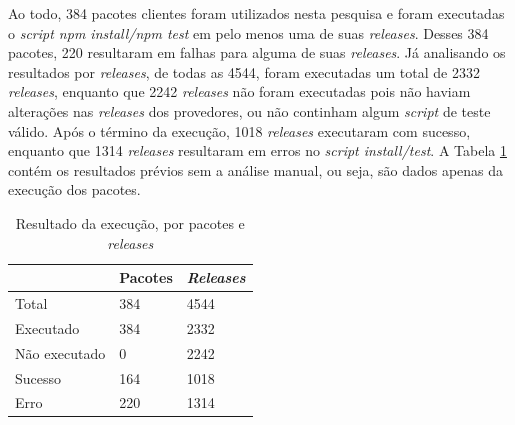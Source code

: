 

Ao todo, 384 pacotes clientes foram utilizados nesta pesquisa e foram executadas o \textit{script npm install/npm test} em pelo menos uma de suas \textit{releases}. Desses 384 pacotes, 220 resultaram em falhas para alguma de suas \textit{releases}. Já analisando os resultados por \textit{releases}, de todas as 4544, foram executadas um total de 2332 \textit{releases}, enquanto que 2242 \textit{releases} não foram executadas pois não haviam alterações nas \textit{releases} dos provedores, ou não continham algum \textit{script} de teste válido. Após o término da execução, 1018 \textit{releases} executaram com sucesso, enquanto que 1314 \textit{releases} resultaram em erros no \textit{script install/test}. A Tabela \ref{tab:res_rq1_1} contém os resultados prévios sem a análise manual, ou seja, são dados apenas da execução dos pacotes.

\begin{table}[]
\centering
\begin{tabular}{|l|l|l|}
\hline
                    & Pacotes & \textit{Releases} \\ \hline
    Total           & 384     & 4544     \\
    Executado       & 384     & 2332     \\
    Não executado   & 0       & 2242     \\
    Sucesso         & 164     & 1018     \\
    Erro            & 220     & 1314     \\ \hline
\end{tabular}
\caption{Resultado da execução, por pacotes e \textit{releases}}
\label{tab:res_rq1_1}
\end{table}

